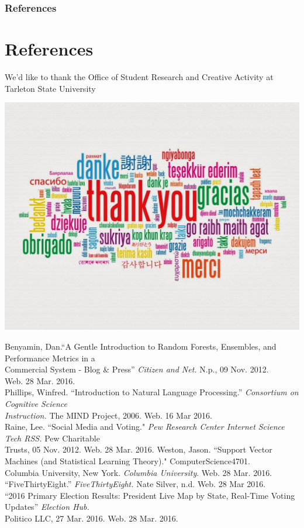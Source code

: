 \documentclass[xcolor=dvipsnames]{beamer}
\begin{document}
\begin{frame}
\frametitle{References}
\section{References}
\small{We'd like to thank the Office of Student Research and Creative Activity at Tarleton State University}
\begin{center}
\includegraphics[scale=.10]{thank-you}
\end{center}
\tiny
\noindent Benyamin, Dan.``A Gentle Introduction to Random Forests, Ensembles, and Performance Metrics in a \\
\hspace{1cm}Commercial System - Blog \& Press''  \textit{Citizen and Net.} N.p., 09 Nov. 2012. \\
\hspace{1cm}Web. 28 Mar. 2016. \\
Phillips, Winfred.  ``Introduction to Natural Language Processing.'' \textit{Consortium on Cognitive Science} \\
\hspace{1cm}\textit{Instruction.} The MIND Project, 2006.  Web.  16 Mar 2016. \\
Raine, Lee. ``Social Media and Voting." \textit{Pew Research Center Internet} \textit{Science Tech RSS.} Pew Charitable \\
\hspace{1cm}Trusts, 05 Nov. 2012. Web. 28 Mar. 2016.
Weston, Jason. ``Support Vector Machines (and Statistical Learning Theory)." ComputerScience4701. \\
\hspace{1cm}Columbia University, New York. \textit{Columbia University}. Web. 28 Mar. 2016.\\
``FiveThirtyEight.'' \textit{FiveThirtyEight.} Nate Silver, n.d. Web.  28 Mar 2016. \\
``2016 Primary Election Results: President Live Map by State, Real-Time Voting Updates'' \textit{Election Hub.} \\ 
\hspace{1cm}Politico LLC, 27 Mar. 2016.  Web.  28 Mar. 2016. \\
\end{frame}
\end{document}
